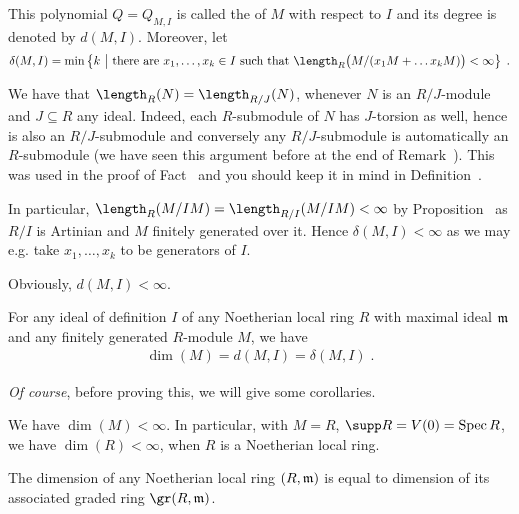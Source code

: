 \documentclass[a4paper,parskip=half,numbers=enddot, DIV=12, headheight=30pt]{scrreprt}
\begin{document}
\begin{defi}
    This polynomial $Q=Q_{M,I}$ is called the  of $M$ with respect to $I$ and its degree is denoted by $d(M,I)$. Moreover, let 
    \begin{align*}
        \delta(M,I) = \min\left\{k \st \text{there are }x_1,\ldots,x_k\in I \text{ such that } \length_R\big(M/(x_1M+\ldots x_k M)\big)<\infty\right\}\;.
    \end{align*}
\end{defi}
\begin{rem*}
    \begin{alphanumerate}
    \item 
        We have that $\length_R(N) = \length_{R/J}(N)$, whenever $N$ is an $R/J$-module and $J\subseteq R$ any ideal. Indeed, each $R$-submodule of $N$ has $J$-torsion as well, hence is also an $R/J$-submodule and conversely any $R/J$-submodule is automatically an $R$-submodule (we have seen this argument before at the end of Remark~). This was used in the proof of Fact~ and you should keep it in mind in Definition~.
     \item   
         In particular, $\length_R(M/IM)=\length_{R/I}(M/IM) < \infty$ by Proposition~ as $R/I$ is Artinian and $M$ finitely generated over it. Hence $\delta(M,I) < \infty$ as we may e.g. take $x_1,\ldots, x_k$ to be generators of $I$.
    \item 
        Obviously, $d(M,I)<\infty$.
    \end{alphanumerate}
\end{rem*}
\begin{thm}
    For any ideal of definition $I$ of any Noetherian local ring $R$ with maximal ideal $\mathfrak{m}$ and any finitely generated $R$-module $M$, we have 
    \begin{align*}
    	\dim (M) = d(M,I) = \delta(M,I)\;.
    \end{align*}    
\end{thm}
\emph{Of course}, before proving this, we will give some corollaries.
\begin{cor}
    We have $\dim(M) <\infty$. In particular, with $M=R$, $\supp R= V(0) = \Spec R$, we have $\dim(R)<\infty$, when $R$ is a Noetherian local ring.
\end{cor}
\begin{cor}
    The dimension of any Noetherian local ring $(R,\mathfrak{m})$ is equal to dimension of its associated graded ring $\gr(R,\mm)$.
\end{cor}
\end{document}
